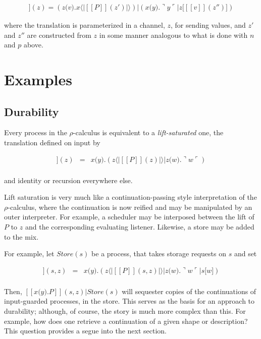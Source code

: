 \documentclass[]{amsart}
\newcommand{\ldb}{[\![}
\newcommand{\rdb}{]\!]}
\newcommand{\lliftb}{\langle\!|}
\newcommand{\rliftb}{|\!\rangle}
\newcommand{\lpquote}{\ulcorner}
\newcommand{\rpquote}{\urcorner}
\newcommand{\id}[1]{\texttt{#1}}
\newcommand{\juxtap}{\mathbin{\id{|}}}
\newcommand{\concat}{\mathbin{\id{.}}}
\newcommand{\binpar}[2]{#1 \juxtap #2}
\newcommand{\outputp}[2]{#1 \id{[} #2 \id{]}}
\newcommand{\prefix}[3]{#1 \id{(} #2 \id{)} \concat #3}
\newcommand{\lift}[2]{#1 \lliftb #2 \rliftb}
\newcommand{\dropn}[1]{\rpquote #1 \lpquote}
\newcommand{\applyp}[2]{#1 \langle #2 \rangle}
\newcommand{\absp}[2]{\id{(} #1 \id{)} #2}
\newcommand{\meaningof}[1]{\ldb #1 \rdb}
\theoremstyle{definition}
\theoremstyle{remark}
\numberwithin{equation}{subsection}
\newcommand{\rhoc}{$\rho$-calculus}
\begin{document}
\begin{eqnarray*}
	\meaningof{\binpar{\outputp{x}{\absp{v}{P}}}{(\prefix{x}{Y}{\applyp{Y}{v}})}}(z)
		= 
	\binpar{(\prefix{z}{v}{\lift{x}{\meaningof{P}(z')}})}
	       {(\binpar{\prefix{x}{y}{\dropn{y}}}{\outputp{z}{\meaningof{v}(z'')}})}
\end{eqnarray*}

where the translation is parameterized in a channel, $z$, for sending
values, and $z'$ and $z''$ are constructed from $z$ in some manner
analogous to what is done with $n$ and $p$ above.

\section{Examples}

\subsection{Durability}

Every process in the {\rhoc} is equivalent to a \emph{lift-saturated}
one, the translation defined on input by

\begin{eqnarray*}
	\meaningof{\prefix{x}{y}{P}} ( z )
		& = &
		 \prefix{x}{y}{( \lift{z}{\meaningof{P}( z )} \juxtap \prefix{z}{w}{\dropn{w}} )} \\
\end{eqnarray*}

and identity or recursion everywhere else. 

Lift saturation is very much like a continuation-passing style
interpretation of the {\rhoc}, where the continuation is now reified
and may be manipulated by an outer interpreter. For example, a
scheduler may be interposed between the lift of $P$ to $z$ and the
corresponding evaluating listener. Likewise, a store may be added to the mix. 

For example, let $Store(s)$ be a process, that takes storage requests on $s$ and set

\begin{eqnarray*}
	\meaningof{\prefix{x}{y}{P}} ( s, z )
		& = &
		 \prefix{x}{y}{( \lift{z}{\meaningof{P}( s, z )} 
				 \juxtap \prefix{z}{w}{\binpar{\dropn{w}}{\outputp{s}{w}}} )} \\
\end{eqnarray*}

Then, $\meaningof{\prefix{x}{y}{P}} ( s, z ) \juxtap Store(s)$ will
sequester copies of the continuations of input-guarded processes, in
the store. This serves as the basis for an approach to durability;
although, of course, the story is much more complex than this. For
example, how does one retrieve a continuation of a given shape or
description? This question provides a segue into the next section.
\end{document}
